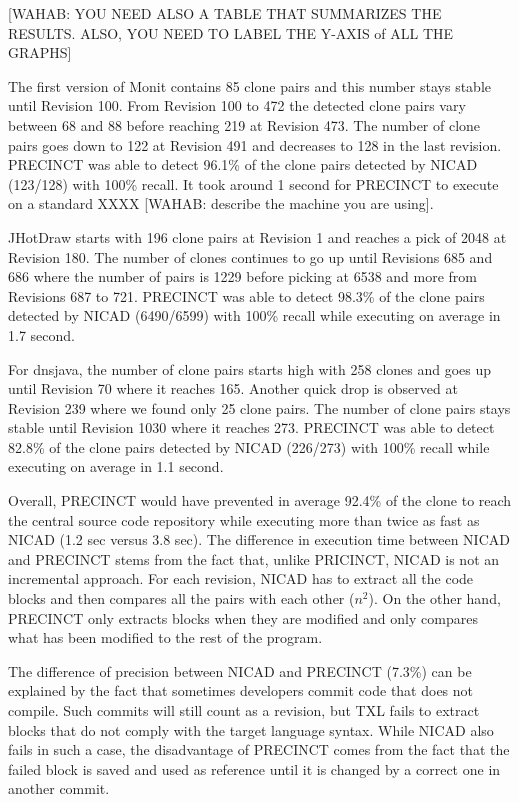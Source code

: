 \documentclass[conference]{IEEEtran}
\begin{document}
[WAHAB: YOU NEED ALSO A TABLE THAT SUMMARIZES THE RESULTS. ALSO, YOU NEED TO LABEL THE Y-AXIS of ALL THE GRAPHS]

The first version of Monit contains 85 clone pairs and this number stays stable until Revision 100. From Revision 100 to 472 the detected clone pairs vary between 68 and 88 before reaching 219 at Revision 473. The number of clone pairs goes down to 122 at Revision 491 and decreases to 128 in the last revision. PRECINCT was able to detect 96.1\% of the clone pairs detected by NICAD (123/128) with 100\% recall. It took around 1 second for PRECINCT to execute on  a standard XXXX [WAHAB: describe the machine you are using]. 

JHotDraw starts with 196 clone pairs at Revision 1 and reaches a pick of 2048 at Revision 180. The number of clones  continues to go up until Revisions 685 and 686 where the number of pairs is 1229 before picking at 6538 and more from Revisions 687 to 721.
PRECINCT was able to detect 98.3\% of the clone pairs detected by NICAD (6490/6599) with 100\% recall while executing on average in 1.7 second.

For dnsjava, the number of clone pairs starts high with 258 clones and goes up until Revision 70 where it reaches 165. Another quick drop is observed at Revision 239 where we found only 25 clone pairs. The number of clone pairs stays stable until Revision 1030 where it reaches 273. PRECINCT was able to detect 82.8\% of the clone pairs detected by NICAD (226/273) with 100\% recall while executing on average in 1.1 second.

Overall, PRECINCT would have prevented in average 92.4\% of the clone to reach the central source code repository while executing more than twice as fast as NICAD (1.2 sec versus 3.8 sec). The difference in execution time between NICAD and PRECINCT stems from the fact that, unlike PRICINCT, NICAD is not an incremental approach. For each revision, NICAD has to extract all the code blocks and then compares all the pairs with each other ($n^2$). On the other hand, PRECINCT only extracts blocks when they are modified and only compares what has been modified to the rest of the program.

The difference of precision between NICAD and PRECINCT (7.3\%)  can be explained by the fact that sometimes developers commit code that does not compile. Such commits will still count as a revision, but TXL fails to extract blocks that do not comply with the target language syntax. While NICAD also fails in such a case, the disadvantage of PRECINCT comes from the fact that the failed block is saved and used as reference until it is changed by a correct one in another commit.
\end{document}
